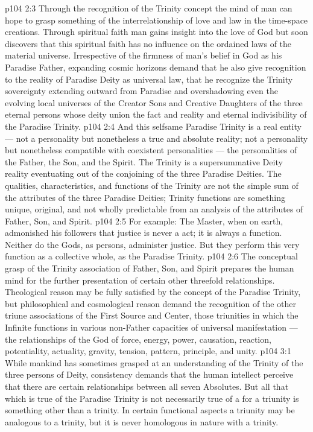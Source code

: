 \vs p104 2:3 Through the recognition of the Trinity concept the mind of man can hope to grasp something of the interrelationship of love and law in the time\hyp{}space creations. Through spiritual faith man gains insight into the love of God but soon discovers that this spiritual faith has no influence on the ordained laws of the material universe. Irrespective of the firmness of man’s belief in God as his Paradise Father, expanding cosmic horizons demand that he also give recognition to the reality of Paradise Deity as universal law, that he recognize the Trinity sovereignty extending outward from Paradise and overshadowing even the evolving local universes of the Creator Sons and Creative Daughters of the three eternal persons whose deity union  the fact and reality and eternal indivisibility of the Paradise Trinity.
\vs p104 2:4 And this selfsame Paradise Trinity is a real entity --- not a personality but nonetheless a true and absolute reality; not a personality but nonetheless compatible with coexistent personalities --- the personalities of the Father, the Son, and the Spirit. The Trinity is a supersummative Deity reality eventuating out of the conjoining of the three Paradise Deities. The qualities, characteristics, and functions of the Trinity are not the simple sum of the attributes of the three Paradise Deities; Trinity functions are something unique, original, and not wholly predictable from an analysis of the attributes of Father, Son, and Spirit.
\vs p104 2:5 For example: The Master, when on earth, admonished his followers that justice is never a  act; it is always a  function. Neither do the Gods, as persons, administer justice. But they perform this very function as a collective whole, as the Paradise Trinity.
\vs p104 2:6 The conceptual grasp of the Trinity association of Father, Son, and Spirit prepares the human mind for the further presentation of certain other threefold relationships. Theological reason may be fully satisfied by the concept of the Paradise Trinity, but philosophical and cosmological reason demand the recognition of the other triune associations of the First Source and Center, those triunities in which the Infinite functions in various non\hyp{}Father capacities of universal manifestation --- the relationships of the God of force, energy, power, causation, reaction, potentiality, actuality, gravity, tension, pattern, principle, and unity.
\vs p104 3:1 While mankind has sometimes grasped at an understanding of the Trinity of the three persons of Deity, consistency demands that the human intellect perceive that there are certain relationships between all seven Absolutes. But all that which is true of the Paradise Trinity is not necessarily true of a  for a triunity is something other than a trinity. In certain functional aspects a triunity may be analogous to a trinity, but it is never homologous in nature with a trinity.
